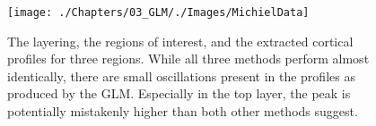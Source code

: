 \begin{figure}[ht]
\centering
\texttt{[image: ./Chapters/03\_GLM/./Images/MichielData]}
\caption{The layering, the regions of interest, and the extracted cortical profiles for three regions. While all three methods perform almost identically, there are small oscillations present in the profiles as produced by the GLM. Especially in the top layer, the peak is potentially mistakenly higher than both other methods suggest.}
\label{fig:exvivovolume}
\end{figure}